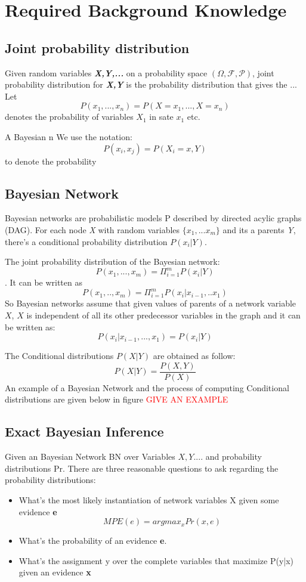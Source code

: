 \newpage
\section{Required Background Knowledge}
    \subsection{Joint probability distribution}
    Given random variables \textbf{\textit{X,Y,...}} on a probability space $(\Omega, \mathcal{F}, \mathcal{P})$, joint probability distribution for \textbf{\textit{X,Y}} is the probability distribution that gives the ...
    Let $$P(x_{1}, ..., x_{n}) = P(X=x_{1}, ... , X = x_{n})$$ denotes the probability of variables $X_{1}$ in sate $x_{1}$ etc. \par
    A Bayesian n
    We use the notation: $$P(x_{i}, x_{j}) = P(X_{i} = x, Y)$$ to denote the probability
    \subsection{Bayesian Network}
    Bayesian networks are probabilistic models P described by directed acylic graphs (DAG). For each node \textit{X} with random variables $\{x_{1}, ... x_{m}\}$ and its a parents \textit{Y}, there's a conditional probability distribution $P(x_{i}|Y)$. \par
    The joint probability distribution of the Bayesian network: $$P(x_{1}, ... , x_{m}) = \Pi_{i = 1}^{m} P(x_{i}|Y)$$.
    It can be written as $$P(x_{1},.., x_{m}) = \Pi_{i = 1}^{m}P(x_{i}|x_{i - 1}, .. x_{1})$$
    So Bayesian networks assume that given values of parents of a network variable $X$, $X$ is independent of all its other predecessor variables in the graph and it can be written as: $$P(x_{i}|x_{i- 1}, ..., x_{1}) = P(x_{i}|Y)$$
    
    The Conditional distributions $P(X|Y)$ are obtained as follow:
    $$P(X|Y) = \frac{P(X,Y)}{P(X)}$$
    An example of a Bayesian Network and the process of computing Conditional distributions are given below in figure \textcolor{red}{GIVE AN EXAMPLE}
    \subsection{Exact Bayesian Inference}
    Given an Bayesian Network BN over Variables ${X, Y...}$. and probability distributions Pr. There are three reasonable questions to ask regarding the probability distributions:
    \begin{itemize}
        \item What's the most likely instantiation of network variables X given some evidence \textbf{e}
        $$MPE(e) = argmax_{x} Pr(x, e)$$
        \item What's the probability of an evidence \textbf{e}.
        \item What's the assignment y over the complete variables that maximize P(y|x) given an evidence \textbf{x}
    \end{itemize}
    
